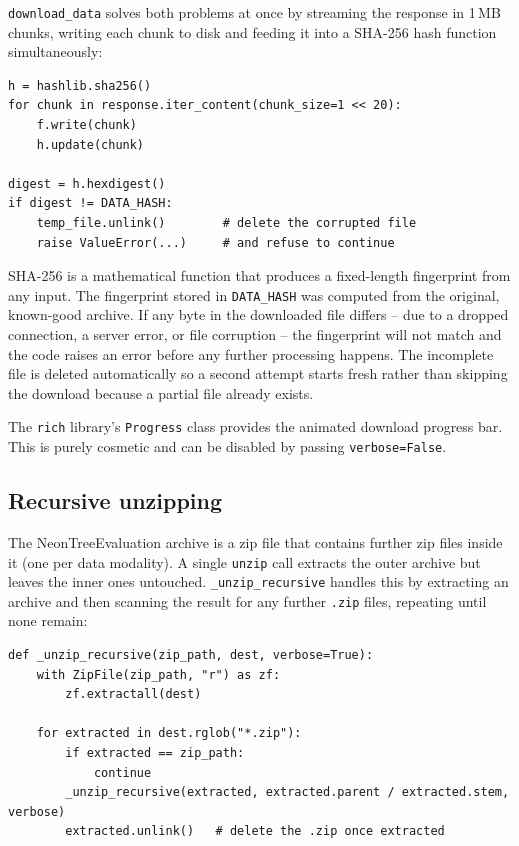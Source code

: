 \documentclass[11pt, a4paper]{article}
\begin{document}
\texttt{download\_data} solves both problems at once by streaming the response
in 1\,MB chunks, writing each chunk to disk and feeding it into a SHA-256 hash
function simultaneously:

\begin{lstlisting}
h = hashlib.sha256()
for chunk in response.iter_content(chunk_size=1 << 20):
    f.write(chunk)
    h.update(chunk)

digest = h.hexdigest()
if digest != DATA_HASH:
    temp_file.unlink()        # delete the corrupted file
    raise ValueError(...)     # and refuse to continue
\end{lstlisting}

SHA-256 is a mathematical function that produces a fixed-length fingerprint
from any input. The fingerprint stored in \texttt{DATA\_HASH} was computed
from the original, known-good archive. If any byte in the downloaded file
differs -- due to a dropped connection, a server error, or file corruption --
the fingerprint will not match and the code raises an error before any further
processing happens. The incomplete file is deleted automatically so a second
attempt starts fresh rather than skipping the download because a partial file
already exists.

The \texttt{rich} library's \texttt{Progress} class provides the animated
download progress bar. This is purely cosmetic and can be disabled by passing
\texttt{verbose=False}.

\subsection{Recursive unzipping}

The NeonTreeEvaluation archive is a zip file that contains further zip files
inside it (one per data modality). A single \texttt{unzip} call extracts the
outer archive but leaves the inner ones untouched.
\texttt{\_unzip\_recursive} handles this by extracting an archive and then
scanning the result for any further \texttt{.zip} files, repeating until none
remain:

\begin{lstlisting}
def _unzip_recursive(zip_path, dest, verbose=True):
    with ZipFile(zip_path, "r") as zf:
        zf.extractall(dest)

    for extracted in dest.rglob("*.zip"):
        if extracted == zip_path:
            continue
        _unzip_recursive(extracted, extracted.parent / extracted.stem, verbose)
        extracted.unlink()   # delete the .zip once extracted
\end{lstlisting}
\end{document}
